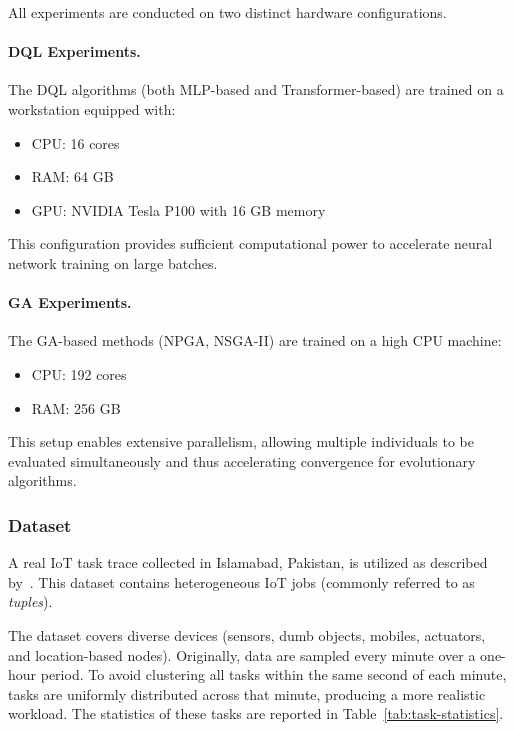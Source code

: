 \documentclass[preprint,3p,authoryear]{elsarticle}
\begin{document}
All experiments are conducted on two distinct hardware configurations.

\paragraph{DQL Experiments.}  
The DQL algorithms (both MLP-based and Transformer-based) are trained on a workstation equipped with:
\begin{itemize}
    \item CPU: 16 cores
    \item RAM: 64 GB
    \item GPU: NVIDIA Tesla P100 with 16 GB memory
\end{itemize}
This configuration provides sufficient computational power to accelerate neural network training on large batches.

\paragraph{GA Experiments.}  
The GA-based methods (NPGA, NSGA-II) are trained on a high CPU machine:
\begin{itemize}
    \item CPU: 192 cores
    \item RAM: 256 GB
\end{itemize}
This setup enables extensive parallelism, allowing multiple individuals to be evaluated simultaneously and thus accelerating convergence for evolutionary algorithms.

\subsubsection{Dataset}\label{subsec:dataset}

A real IoT task trace collected in Islamabad, Pakistan, is utilized as described by~\cite{aazam_cloud_2022}. This dataset contains heterogeneous IoT jobs (commonly referred to as \emph{tuples}).

The dataset covers diverse devices (sensors, dumb objects, mobiles, actuators, and location-based nodes). Originally, data are sampled every minute over a one-hour period. To avoid clustering all tasks within the same second of each minute, tasks are uniformly distributed across that minute, producing a more realistic workload. The statistics of these tasks are reported in Table~\ref{tab:task-statistics}.
\end{document}
